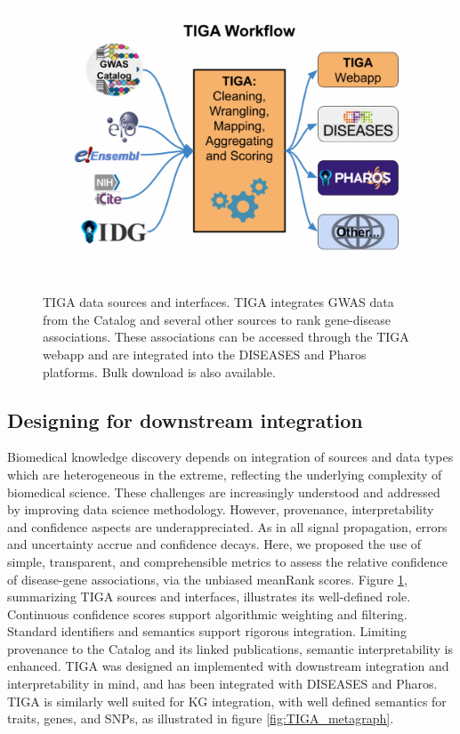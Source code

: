 \begin{figure}
	\includegraphics[width=\textwidth]{figures/tiga/FIG09_TIGA_Workflow.jpg}
	\caption{TIGA data sources and interfaces. TIGA integrates GWAS data from the Catalog and several other sources to rank gene-disease associations. These associations can be accessed through the TIGA webapp and are integrated into the DISEASES\cite{Pletscher-Frankild2015-oo} and Pharos platforms. Bulk download is also available.}
	\label{fig:TIGA_09}
\end{figure}

\subsection{Designing for downstream integration}

Biomedical knowledge discovery depends on integration of sources and data types which are heterogeneous in the extreme, reflecting the underlying complexity of biomedical science. These challenges are increasingly understood and addressed by improving data science methodology. However, provenance, interpretability and confidence aspects are underappreciated. As in all signal propagation, errors and uncertainty accrue and confidence decays. Here, we proposed the use of simple, transparent, and comprehensible metrics to assess the relative confidence of disease-gene associations, via the unbiased meanRank scores. Figure \ref{fig:TIGA_09}, summarizing TIGA sources and interfaces, illustrates its well-defined role. Continuous confidence scores support algorithmic weighting and filtering. Standard identifiers and semantics support rigorous integration. Limiting provenance to the Catalog and its linked publications, semantic interpretability is enhanced. TIGA was designed an implemented with downstream integration and interpretability in mind, and has been integrated with DISEASES and Pharos. TIGA is similarly well suited for KG integration, with well defined semantics for traits, genes, and SNPs, as illustrated in figure \ref{fig:TIGA_metagraph}.

